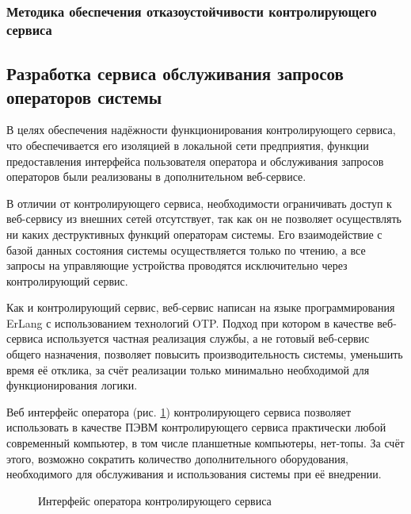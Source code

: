 \subsubsection{Методика обеспечения отказоустойчивости контролирующего
сервиса}

\subsection{Разработка сервиса обслуживания запросов операторов системы}
В целях обеспечения надёжности функционирования контролирующего сервиса, что обеспечивается его
 изоляцией в локальной сети предприятия, функции предоставления интерфейса пользователя оператора
и обслуживания запросов операторов были реализованы в дополнительном веб-сервисе.

В отличии от контролирующего сервиса, необходимости ограничивать доступ к веб-сервису из внешних
сетей отсутствует, так как он не позволяет осуществлять ни каких деструктивных функций
операторам системы. Его взаимодействие с базой данных состояния системы осуществляется только по чтению,
а все запросы на управляющие устройства проводятся исключительно через контролирующий сервис.

Как и контролирующий сервис, веб-сервис написан на языке программирования ErLang с использованием технологий
OTP. Подход при котором в качестве веб-сервиса используется частная реализация службы, а не готовый веб-сервис
общего назначения, позволяет повысить производительность системы, уменьшить время её отклика, за счёт реализации
только минимально необходимой для функционирования логики.

Веб интерфейс оператора (рис. \ref{img:acsIf}) контролирующего сервиса позволяет использовать в качестве
ПЭВМ контролирующего сервиса практически любой современный компьютер, в том числе планшетные компьютеры, нет-топы.
За счёт этого, возможно сократить количество дополнительного оборудования, необходимого для обслуживания и использования
системы при её внедрении.

\begin{figure}[h]
	\caption{Интерфейс оператора контролирующего сервиса}
	\label{img:acsIf}
\end{figure}

